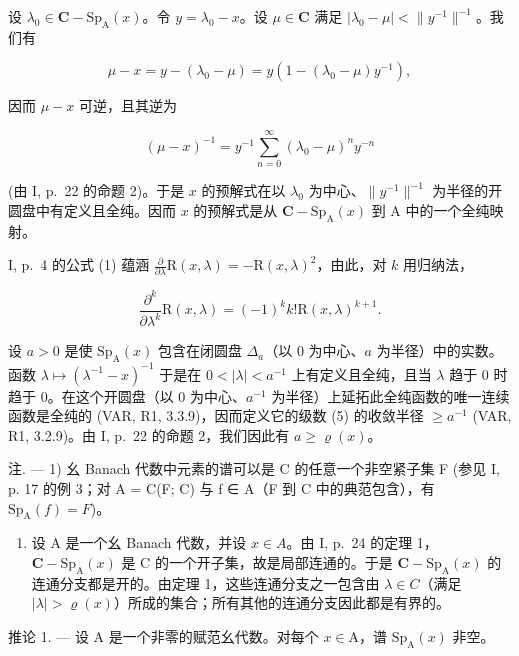 设 \(\lambda_0\in \mathbf{C} - \mathrm{Sp}_{\mathrm{A}}(x)\)。令 \(y = \lambda_0 - x\)。设 \(\mu \in \mathbf{C}\) 满足 \(|\lambda_0 - \mu | < \| y^{-1}\|^{-1}\)。我们有

\[
\mu - x = y - (\lambda_ {0} - \mu) = y (1 - (\lambda_ {0} - \mu) y ^ {- 1}),
\]

因而 \(\mu - x\) 可逆，且其逆为

\[
(\mu - x) ^ {- 1} = y ^ {- 1} \sum_ {n = 0} ^ {\infty} (\lambda_ {0} - \mu) ^ {n} y ^ {- n}\tag{6}
\]

(由 I, p.~22 的命题 2)。于是 \(x\) 的预解式在以 \(\lambda_0\) 为中心、\(\| y^{-1} \|^{-1}\) 为半径的开圆盘中有定义且全纯。因而 \(x\) 的预解式是从 \(\mathbf{C} - \mathrm{Sp}_{\mathrm{A}}(x)\) 到 A 中的一个全纯映射。

I, p.~4 的公式 (1) 蕴涵 \(\frac{\partial}{\partial\lambda}\mathrm{R}(x,\lambda) = -\mathrm{R}(x,\lambda)^2\)，由此，对 \(k\) 用归纳法，

\[
\frac {\partial^ {k}}{\partial \lambda^ {k}} \mathrm{R} (x, \lambda) = (- 1) ^ {k} k! \mathrm{R} (x, \lambda) ^ {k + 1}.
\]

设 \(a > 0\) 是使 \(\mathrm{Sp}_{\mathrm{A}}(x)\) 包含在闭圆盘 \(\Delta_{a}\)（以 0 为中心、\(a\) 为半径）中的实数。函数 \(\lambda \mapsto (\lambda^{-1} - x)^{-1}\) 于是在 \(0 < |\lambda| < a^{-1}\) 上有定义且全纯，且当 \(\lambda\) 趋于 0 时趋于 0。在这个开圆盘（以 0 为中心、\(a^{-1}\) 为半径）上延拓此全纯函数的唯一连续函数是全纯的 (VAR, R1, 3.3.9)，因而定义它的级数 (5) 的收敛半径 \(\geqslant a^{-1}\) (VAR, R1, 3.2.9)。由 I, p.~22 的命题 2，我们因此有 \(a \geqslant \varrho(x)\)。

注. --- 1) 幺 Banach 代数中元素的谱可以是 C 的任意一个非空紧子集 F (参见 I, p. 17 的例 3；对 A = C(F; C) 与 f ∈ A（F 到 C 中的典范包含），有 \(\mathrm{Sp}_{\mathrm{A}}(f) = F\))。

\begin{enumerate}
\def\labelenumi{\arabic{enumi})}
\setcounter{enumi}{1}
\tightlist
\item
  设 A 是一个幺 Banach 代数，并设 \(x \in A\)。由 I, p.~24 的定理 1，\(\mathbf{C} - \mathrm{Sp}_{\mathrm{A}}(x)\) 是 C 的一个开子集，故是局部连通的。于是 \(\mathbf{C} - \mathrm{Sp}_{\mathrm{A}}(x)\) 的连通分支都是开的。由定理 1，这些连通分支之一包含由 \(\lambda \in C\)（满足 \(|\lambda| > \varrho(x)\)）所成的集合；所有其他的连通分支因此都是有界的。
\end{enumerate}

推论 1. --- 设 A 是一个非零的赋范幺代数。对每个 \(x \in \mathrm{A}\)，谱 \(\mathrm{Sp}_{\mathrm{A}}(x)\) 非空。

